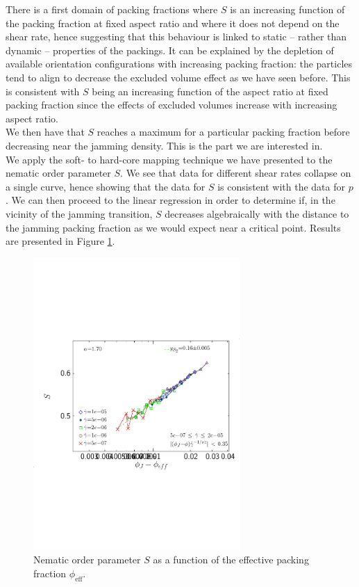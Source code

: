 \documentclass[class=article, float=false, crop=false]{standalone}
\begin{document}
There is a first domain of packing fractions where $S$ is an increasing function of the packing fraction at fixed aspect ratio and where it does not depend on the shear rate, hence suggesting that this behaviour is linked to static -- rather than dynamic -- properties of the packings. It can be explained by the depletion of available orientation configurations with increasing packing fraction: the particles tend to align to decrease the excluded volume effect as we have seen before. This is consistent with $S$ being an increasing function of the aspect ratio at fixed packing fraction since the effects of excluded volumes increase with increasing aspect ratio.\\

We then have that $S$ reaches a maximum for a particular packing fraction before decreasing near the jamming density. This is the part we are interested in.\\

We apply the soft- to hard-core mapping technique we have presented to the nematic order parameter $S$. We see that data for different shear rates collapse on a single curve, hence showing that the data for $S$ is consistent with the data for $p$. We can then proceed to the linear regression in order to determine if, in the vicinity of the jamming transition, $S$ decreases algebraically with the distance to the jamming packing fraction as we would expect near a critical point. Results are presented in Figure \ref{scaling_S}.\\

\begin{figure}[h!]
\centering
\includegraphics[width=0.7\textwidth]{figures/figs/S2_scale_1024_KDk500_Ml100_EL170_2.pdf}
\caption{Nematic order parameter $S$ as a function of the effective packing fraction $\phi_{\text{eff}}$.}
\label{scaling_S}
\end{figure}
\end{document}
